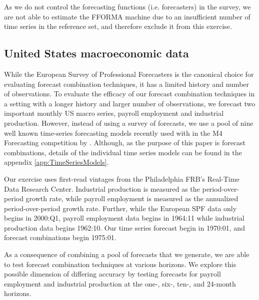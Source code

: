 \documentclass[12pt]{article}
\begin{document}
As we do not control the forecasting functions (i.e. forecasters) in the survey, we are not able to estimate the FFORMA machine due to an insufficient number of time series in the reference set, and therefore exclude it from this exercise. 

\subsection{United States macroeconomic data}
While the European Survey of Professional Forecasters is the canonical choice for evaluating forecast combination techniques, it has a limited history and number of observations. To evaluate the efficacy of our forecast combination techniques in a setting with a longer history and larger number of observations, we  forecast two important monthly US macro series, payroll employment and industrial production. However, instead of using a survey of forecasts, we use a pool of nine well known time-series forecasting models recently used with in the M4 Forecasting competition by \cite{MMAHT2018}. Although, as the purpose of this paper is forecast combinations, details of the individual time series models can be found in the appendix \ref{app:TimeSeriesModels}.

Our exercise uses first-read vintages from the Philadelphia FRB's Real-Time Data Research Center. Industrial production is measured as the period-over-period growth rate, while payroll employment is measured as the annualized period-over-period growth rate. Further, while the European SPF data only begins in 2000:Q1, payroll employment data begins in 1964:11 while industrial production data begins 1962:10. Our time series forecast begin in 1970:01, and forecast combinations begin 1975:01.

As a consequence of combining a pool of forecasts that we generate, we are able to test forecast combination techniques at various horizons. We explore this possible dimension of differing accuracy by testing forecasts for payroll employment and industrial production at the one-, six-, ten-, and 24-month horizons.  



\end{document}
